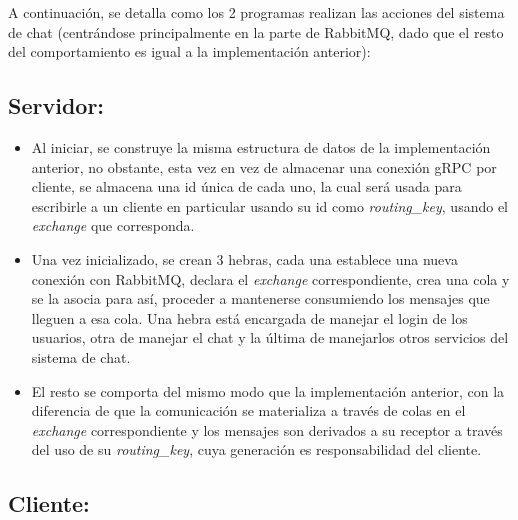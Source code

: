 \documentclass[11pt, letter]{article}
\begin{document}
A continuación, se detalla como los 2 programas realizan las acciones del sistema de chat (centrándose principalmente en la parte de RabbitMQ, dado que el resto del comportamiento es igual a la implementación anterior):

\subsection{Servidor:}

\begin{itemize}
	\item Al iniciar, se construye la misma estructura de datos de la implementación anterior, no obstante, esta vez en vez de almacenar una conexión gRPC por cliente, se almacena una id única de cada uno, la cual será usada para escribirle a un cliente en particular usando su id como \textit{routing\_key}, usando el \textit{exchange} que corresponda.
	\item Una vez inicializado, se crean 3 hebras, cada una establece una nueva conexión con RabbitMQ, declara el \textit{exchange} correspondiente, crea una cola y se la asocia para así, proceder a mantenerse consumiendo los mensajes que lleguen a esa cola. Una hebra está encargada de manejar el login de los usuarios, otra de manejar el chat y la última de manejarlos otros servicios del sistema de chat.
	\item El resto se comporta del mismo modo que la implementación anterior, con la diferencia de que la comunicación se materializa a través de colas en el \textit{exchange} correspondiente y los mensajes son derivados a su receptor a través del uso de su \textit{routing\_key}, cuya generación es responsabilidad del cliente.
\end{itemize}

\subsection{Cliente:}
\end{document}

